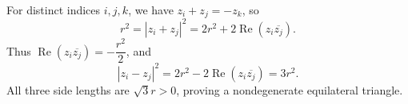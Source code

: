 For distinct indices $i,j,k$, we have $z_i+z_j=-z_k$, so
\[
r^2=|z_i+z_j|^2=2r^2+2\operatorname{Re}(z_i\overline{z_j}).
\]
Thus $\operatorname{Re}(z_i\overline{z_j})=-\dfrac{r^2}{2}$, and
\[
|z_i-z_j|^2=2r^2-2\operatorname{Re}(z_i\overline{z_j})=3r^2.
\]
All three side lengths are $\sqrt3r>0$, proving a nondegenerate equilateral triangle.
